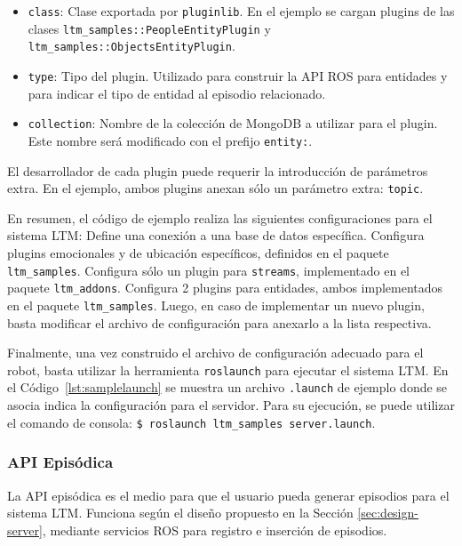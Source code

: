 \begin{itemize}
\begin{itemize}
	\item \texttt{class}: Clase exportada por \texttt{pluginlib}. En el ejemplo se cargan plugins de las clases \texttt{ltm\_samples::PeopleEntityPlugin} y \texttt{ltm\_samples::ObjectsEntityPlugin}.
	\item \texttt{type}: Tipo del plugin. Utilizado para construir la API ROS para entidades y para indicar el tipo de entidad al episodio relacionado.
	\item \texttt{collection}: Nombre de la colección de MongoDB a utilizar para el plugin. Este nombre será modificado con el prefijo \texttt{entity:}.
\end{itemize}
El desarrollador de cada plugin puede requerir la introducción de parámetros extra. En el ejemplo, ambos plugins anexan sólo un parámetro extra: \texttt{topic}.
\end{itemize}

En resumen, el código de ejemplo realiza las siguientes configuraciones para el sistema LTM: Define una conexión a una base de datos específica. Configura plugins emocionales y de ubicación específicos, definidos en el paquete \texttt{ltm\_samples}. Configura sólo un plugin para \texttt{streams}, implementado en el paquete \texttt{ltm\_addons}. Configura 2 plugins para entidades, ambos implementados en el paquete \texttt{ltm\_samples}. Luego, en caso de implementar un nuevo plugin, basta modificar el archivo de configuración para anexarlo a la lista respectiva.

Finalmente, una vez construido el archivo de configuración adecuado para el robot, basta utilizar la herramienta \texttt{roslaunch} para ejecutar el sistema LTM. En el Código~\ref{lst:samplelaunch} se muestra un archivo \texttt{.launch} de ejemplo donde se asocia indica la configuración para el servidor. Para su ejecución, se puede utilizar el comando de consola: \texttt{\$ roslaunch ltm\_samples server.launch}.
\lstset{style=/Style/XML/ROS}



\subsubsection{API Episódica}

La API episódica es el medio para que el usuario pueda generar episodios para el sistema LTM. Funciona según el diseño propuesto en la Sección \ref{sec:design-server}, mediante servicios ROS para registro e inserción de episodios.

